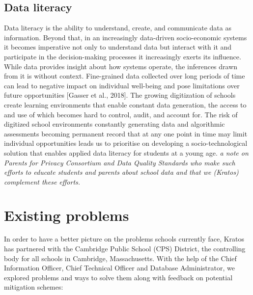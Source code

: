 \documentclass{article}
\begin{document}
\subsection{Data literacy}
Data literacy is the ability to understand, create, and communicate data as information. Beyond that, in an increasingly data-driven socio-economic systems it becomes imperative not only to understand data but interact with it and participate in the decision-making processes it increasingly exerts its influence. While data provides insight about how systems operate, the inferences drawn from it is without context. Fine-grained data collected over long periods of time can lead to negative impact on individual well-being and pose limitations over future opportunities [Gasser et al., 2018]. The growing digitization of schools create learning environments that enable constant data generation, the access to and use of which becomes hard to control, audit, and account for. The risk of digitized school environments constantly generating data and algorithmic assessments becoming permanent record that at any one point in time may limit individual opportunities leads us to prioritise on developing a socio-technological solution that enables applied data literacy for students at a young age. \textit{a note on Parents for Privacy Consortium and Data Quality Standards who make such efforts to educate students and parents about school data and that we (Kratos) complement these efforts.}

\section{Existing problems}
In order to have a better picture on the problems schools currently face, Kratos has partnered with the Cambridge Public School (CPS) District, the controlling body for all schools in Cambridge, Massachusetts. With the help of the Chief Information Officer, Chief Technical Officer and Database Administrator, we explored problems and ways to solve them along with feedback on potential mitigation schemes:
\end{document}
